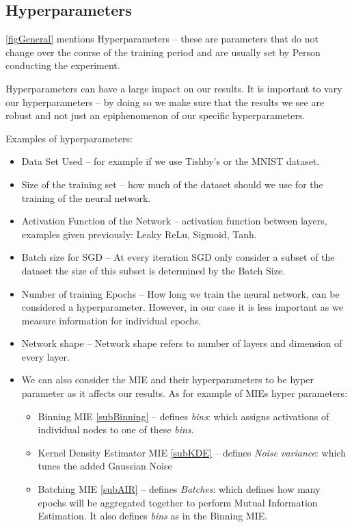 \documentclass[dissertation.tex]{subfiles}
\begin{document}
\subsection{Hyperparameters}
\label{subHyperParameters}

\autoref{figGeneral} mentions Hyperparameters -- these are parameters that do
not change over the course of the training period and are usually set by Person
conducting the experiment.  

Hyperparameters can have a large impact on our results. It is important to vary
our hyperparameters -- by doing so we make sure that the results we see are
robust and not just an epiphenomenon of our specific hyperparameters.

Examples of hyperparameters:
\begin{itemize}
  \item{
      Data Set Used -- for example if we use Tishby's\cite{DATATISHBY}
      or the MNIST\cite{DATAMNIST} dataset.
    }
  \item{
      Size of the training set -- how much of the dataset should we use for the
      training of the neural network.
    }
  \item{
      Activation Function of the Network -- activation function between layers,
      examples given previously: Leaky ReLu, Sigmoid, Tanh.
    }
  \item{
      Batch size for SGD -- At every iteration SGD only consider a subset of the
      dataset the size of this subset is determined by the Batch Size.
    }
  \item{
      Number of training Epochs -- How long we train the neural network, can be
      considered a hyperparameter. However, in our case it is less important as
      we measure information for individual epochs.
    }
  \item{
      Network shape -- Network shape refers to number of layers and dimension of
      every layer. 
    }
  \item{
      We can also consider the MIE and their hyperparameters to be hyper
      parameter as it affects our results. As for example of MIEs hyper
      parameters: 
      \begin{itemize}
        \item{
            Binning MIE \autoref{subBinning} -- defines \emph{bins}: which assigns
            activations of individual nodes to one of these \emph{bins}.
          }
        \item{
            Kernel Density Estimator MIE \autoref{subKDE} -- defines \emph{Noise
            variance}: which tunes the added Gaussian Noise
          }
        \item{
            Batching MIE \autoref{subAIR} -- defines \emph{Batches}: which defines how
            many epochs will be aggregated together to perform Mutual
            Information Estimation. It also defines \emph{bins} as in the
            Binning MIE.
          }
      \end{itemize}
    }
\end{itemize}
\end{document}
